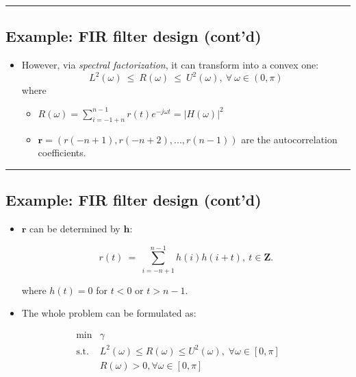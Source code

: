 \documentclass[]{article}
\providecommand{\tightlist}{%
  \setlength{\itemsep}{0pt}\setlength{\parskip}{0pt}}
\begin{document}
\begin{center}\rule{0.5\linewidth}{\linethickness}\end{center}

\hypertarget{example-fir-filter-design-contd-1}{%
\subsection{Example: FIR filter design
(cont'd)}\label{example-fir-filter-design-contd-1}}

\begin{itemize}
\tightlist
\item
  However, via \emph{spectral factorization}, it can transform into a
  convex one:
  \[L^2(\omega)~\leq~R(\omega)~\leq~U^2(\omega),~\forall~\omega\in(0,\pi)\]
  where

  \begin{itemize}
  \tightlist
  \item
    \(R(\omega)=\sum_{i=-1+n}^{n-1}{r(t)e^{-j{\omega}t}}=|H(\omega)|^2\)
  \item
    \(\mathbf{r}=(r(-n+1),r(-n+2),...,r(n-1))\) are the autocorrelation
    coefficients.
  \end{itemize}
\end{itemize}

\begin{center}\rule{0.5\linewidth}{\linethickness}\end{center}

\hypertarget{example-fir-filter-design-contd-2}{%
\subsection{Example: FIR filter design
(cont'd)}\label{example-fir-filter-design-contd-2}}

\begin{itemize}
\item
  \(\mathbf{r}\) can be determined by \(\mathbf{h}\):

  \[r(t)~=~\sum_{i=-n+1}^{n-1}{h(i)h(i+t)},~t\in\mathbf{Z}.\]

  where \(h(t)=0\) for \(t < 0\) or \(t > n-1\).
\item
  The whole problem can be formulated as:
\end{itemize}

\[\begin{array}{ll}
  \text{min}  & \gamma \\
  \text{s.t.} & L^2(\omega) \leq R(\omega) \leq U^2(\omega), \; \forall \omega \in [0,\pi]   \\
              & R(\omega) > 0, \forall \omega \in [0,\pi]
\end{array}\]
\end{document}
